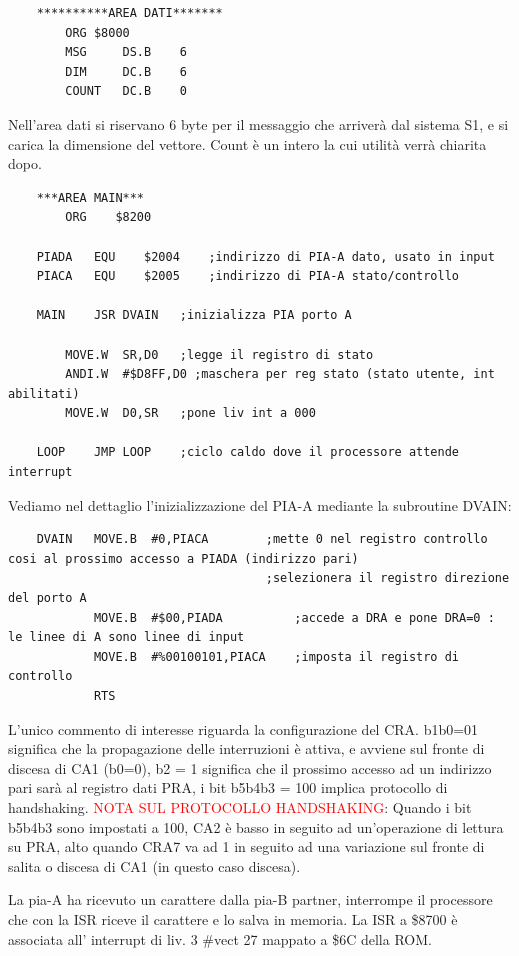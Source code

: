 \begin{lstlisting}
    **********AREA DATI*******
        ORG	$8000
        MSG	    DS.B	6
        DIM	    DC.B	6
        COUNT   DC.B	0
\end{lstlisting}

Nell'area dati si riservano 6 byte per il messaggio che arriverà dal sistema S1, e si carica la dimensione del vettore. Count è un intero la cui utilità verrà chiarita dopo.

\begin{lstlisting}
    ***AREA MAIN***	
        ORG    $8200

    PIADA	EQU    $2004	;indirizzo di PIA-A dato, usato in input
    PIACA	EQU    $2005	;indirizzo di PIA-A stato/controllo

    MAIN	JSR	DVAIN	;inizializza PIA porto A
                    
        MOVE.W	SR,D0	;legge il registro di stato
        ANDI.W	#$D8FF,D0 ;maschera per reg stato (stato utente, int abilitati)
        MOVE.W	D0,SR	;pone liv int a 000

    LOOP  	JMP LOOP	;ciclo caldo dove il processore attende interrupt	
\end{lstlisting}

Vediamo nel dettaglio l'inizializzazione del PIA-A mediante la subroutine DVAIN:

\begin{lstlisting}
    DVAIN	MOVE.B	#0,PIACA		;mette 0 nel registro controllo cosi al prossimo accesso a PIADA (indirizzo pari)
								    ;selezionera il registro direzione del porto A
            MOVE.B	#$00,PIADA		    ;accede a DRA e pone DRA=0 : le linee di A sono linee di input	
            MOVE.B	#%00100101,PIACA  	;imposta il registro di controllo
            RTS
\end{lstlisting}

L'unico commento di interesse riguarda la configurazione del CRA. b1b0=01 significa che la propagazione delle interruzioni è attiva, e avviene sul fronte di discesa di CA1 (b0=0), b2 = 1 significa che il prossimo accesso ad un indirizzo pari sarà al registro dati PRA, i bit b5b4b3 = 100 implica protocollo di handshaking. 
\textcolor{red}{NOTA SUL PROTOCOLLO HANDSHAKING}: 
Quando i bit b5b4b3 sono impostati a 100, CA2 è basso in seguito ad un'operazione di lettura su PRA, alto quando CRA7 va ad 1 in seguito ad una variazione sul fronte di salita o discesa di CA1 (in questo caso discesa).

La pia-A ha ricevuto un carattere dalla pia-B partner, interrompe il processore che con la ISR riceve il carattere e lo salva in memoria.
La ISR a \$8700 è associata all' interrupt di liv. 3  \#vect 27  mappato a \$6C della ROM.

